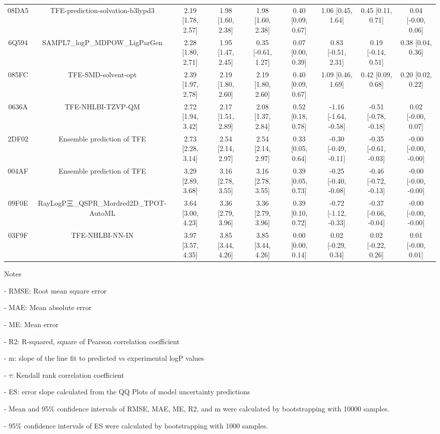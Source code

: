 \documentclass{article}
\begin{document}
\begin{center}
\begin{longtable}{|ccccccccc|}
 08DA5 &                   TFE-prediction-solvation-b3lypd3 &  2.19 [1.78, 2.57] &  1.98 [1.60, 2.38] &     1.98 [1.60, 2.38] &  0.40 [0.09, 0.67] &     1.06 [0.45, 1.64] &     0.45 [0.11, 0.71] &    0.04 [-0.00, 0.06] \\
 6Q594 &                     SAMPL7\_logP\_MDPOW\_LigParGen &  2.28 [1.80, 2.71] &  1.95 [1.47, 2.45] &    0.35 [-0.61, 1.27] &  0.07 [0.00, 0.39] &    0.83 [-0.51, 2.31] &    0.19 [-0.14, 0.51] &     0.38 [0.04, 0.36] \\
 085FC &                                TFE-SMD-solvent-opt &  2.39 [1.97, 2.78] &  2.19 [1.80, 2.60] &     2.19 [1.80, 2.60] &  0.40 [0.09, 0.67] &     1.09 [0.46, 1.69] &     0.42 [0.09, 0.68] &     0.20 [0.02, 0.22] \\
 0636A &                                  TFE-NHLBI-TZVP-QM &  2.72 [1.94, 3.42] &  2.17 [1.51, 2.89] &     2.08 [1.37, 2.84] &  0.52 [0.18, 0.78] &  -1.16 [-1.64, -0.58] &  -0.51 [-0.78, -0.18] &    0.02 [-0.00, 0.07] \\
 2DF02 &                         Ensemble prediction of TFE &  2.73 [2.28, 3.14] &  2.54 [2.14, 2.97] &     2.54 [2.14, 2.97] &  0.33 [0.05, 0.64] &  -0.30 [-0.49, -0.11] &  -0.35 [-0.61, -0.03] &  -0.00 [-0.00, -0.00] \\
 004AF &                         Ensemble prediction of TFE &  3.29 [2.89, 3.68] &  3.16 [2.78, 3.55] &     3.16 [2.78, 3.55] &  0.39 [0.05, 0.73] &  -0.25 [-0.40, -0.08] &  -0.46 [-0.72, -0.13] &  -0.00 [-0.00, -0.00] \\
 09F0E &             RayLogP三\_QSPR\_Mordred2D\_TPOT-AutoML &  3.64 [3.00, 4.23] &  3.36 [2.79, 3.96] &     3.36 [2.79, 3.96] &  0.39 [0.10, 0.72] &  -0.72 [-1.12, -0.33] &  -0.37 [-0.66, -0.04] &  -0.00 [-0.00, -0.00] \\
 03F9F &                                    TFE-NHLBI-NN-IN &  3.97 [3.57, 4.35] &  3.85 [3.44, 4.26] &     3.85 [3.44, 4.26] &  0.00 [0.00, 0.14] &    0.02 [-0.29, 0.34] &    0.02 [-0.22, 0.26] &    0.01 [-0.00, 0.01] \\
\end{longtable}
\end{center}

Notes

- RMSE: Root mean square error

- MAE: Mean absolute error

- ME: Mean error

- R2: R-squared, square of Pearson correlation coefficient

- m: slope of the line fit to predicted vs experimental logP values

- $\tau$:  Kendall rank correlation coefficient

- ES: error slope calculated from the QQ Plots of model uncertainty predictions

- Mean and 95\% confidence intervals of RMSE, MAE, ME, R2, and m were calculated by bootstrapping with 10000 samples.

- 95\% confidence intervals of ES were calculated by bootstrapping with 1000 samples.\end{document}
\end{document}
